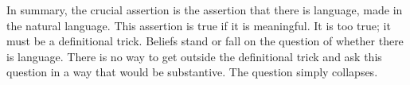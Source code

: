 In summary, the crucial assertion is the assertion that there is language, 
made in the natural language. This assertion is true if it is meaningful. It is 
too true; it must be a definitional trick. Beliefs stand or fall on the question 
of whether there is language. There is no way to get outside the definitional 
trick and ask this question in a way that would be substantive. The question 
simply collapses. 


